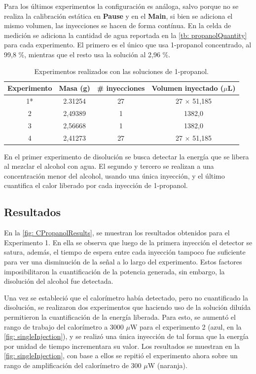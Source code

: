 	
	
	Para los \'ultimos experimentos la configuraci\'on es an\'aloga, salvo porque no se realiza la calibraci\'on est\'atica en \textbf{Pause} y en el \textbf{Main}, si bien se adiciona el mismo volumen, las inyecciones se hacen de forma cont\'inua. En la celda de medici\'on se adiciona la cantidad de agua reportada en la \autoref{tb: propanolQuantity} para cada experimento. El primero es el \'unico que usa 1-propanol concentrado, al 99,8 \%, mientras que el resto usa la soluci\'on al 2,96 \%.
	\begin{table}[h]
		\centering
		\caption{Experimentos realizados con las soluciones de 1-propanol.}
		\begin{tabular}{cccc}
			\hline
			\textbf{Experimento} & \textbf{Masa \ce{H2O} (g)} & \textbf{\# inyecciones} & \textbf{Volumen inyectado ($\mu$L)}\\
			\hline
			1* & 2.31254 & 27 & 27 $\times$ 51,185 \\
			2 & 2,49389 & 1 & 1382,0 \\
			3 & 2,56668 & 1 & 1382,0 \\
			4 & 2,41273 & 27 & 27 $\times$ 51,185 \\
			\hline
		\end{tabular}
		\label{tb: propanolQuantity}
	\end{table}
	
	En el primer experimento de disoluci\'on se busca detectar la energ\'ia que se libera al mezclar el alcohol con agua. El segundo y tercero se realizan a una concentraci\'on menor del alcohol, usando una \'unica inyecci\'on, y el \'ultimo cuantifica el calor liberado por cada inyecci\'on de 1-propanol.
	
	\subsection{Resultados}
		En la \autoref{fig: CPropanolResults}, se muestran los resultados obtenidos para el Experimento 1. En ella se observa que luego de la primera inyecci\'on el detector se satura, adem\'as, el tiempo de espera entre cada inyecci\'on tampoco fue suficiente para ver una disminuci\'on de la se\~nal a lo largo del experimento. Estos factores imposibilitaron la cuantificaci\'on de la potencia generada, sin embargo, la disoluci\'on del alcohol fue detectada.
		
		Una vez se estableci\'o que el calor\'imetro hab\'ia detectado, pero no cuantificado la disoluci\'on, se realizaron dos experimentos que haciendo uso de la soluci\'on dilu\'ida permitieron la cuantificaci\'on de la energ\'ia liberada. Para esto, se aument\'o el rango de trabajo del calor\'imetro a 3000 $\mu$W para el experimento 2 (azul, en la \autoref{fig: singleInjection}), y se realiz\'o una \'unica inyecci\'on de tal forma que la energ\'ia por unidad de tiempo incrementara su valor. Los resultados se muestran en la \autoref{fig: singleInjection}, con base a ellos se repiti\'o el experimento ahora sobre un rango de amplificaci\'on del calor\'imetro de 300 $\mu$W (naranja).
		
